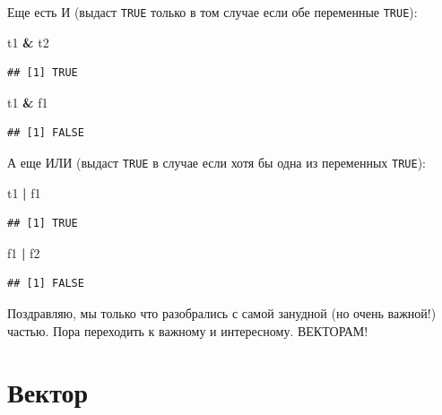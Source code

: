 \documentclass[]{book}
\newenvironment{Shaded}{\begin{snugshade}}{\end{snugshade}}
\newcommand{\StringTok}[1]{\textcolor[rgb]{0.31,0.60,0.02}{#1}}
\newcommand{\OperatorTok}[1]{\textcolor[rgb]{0.81,0.36,0.00}{\textbf{#1}}}
\newcommand{\NormalTok}[1]{#1}
\begin{document}
Еще есть И (выдаст \texttt{TRUE} только в том случае если обе переменные
\texttt{TRUE}):

\begin{Shaded}
\begin{Highlighting}[]
\NormalTok{t1 }\OperatorTok{&}\StringTok{ }\NormalTok{t2}
\end{Highlighting}
\end{Shaded}

\begin{verbatim}
## [1] TRUE
\end{verbatim}

\begin{Shaded}
\begin{Highlighting}[]
\NormalTok{t1 }\OperatorTok{&}\StringTok{ }\NormalTok{f1}
\end{Highlighting}
\end{Shaded}

\begin{verbatim}
## [1] FALSE
\end{verbatim}

А еще ИЛИ (выдаст \texttt{TRUE} в случае если хотя бы одна из переменных
\texttt{TRUE}):

\begin{Shaded}
\begin{Highlighting}[]
\NormalTok{t1 }\OperatorTok{|}\StringTok{ }\NormalTok{f1}
\end{Highlighting}
\end{Shaded}

\begin{verbatim}
## [1] TRUE
\end{verbatim}

\begin{Shaded}
\begin{Highlighting}[]
\NormalTok{f1 }\OperatorTok{|}\StringTok{ }\NormalTok{f2}
\end{Highlighting}
\end{Shaded}

\begin{verbatim}
## [1] FALSE
\end{verbatim}

Поздравляю, мы только что разобрались с самой занудной (но очень
важной!) частью. Пора переходить к важному и интересному. ВЕКТОРАМ!

\section{Вектор}\label{atomic}
\end{document}
